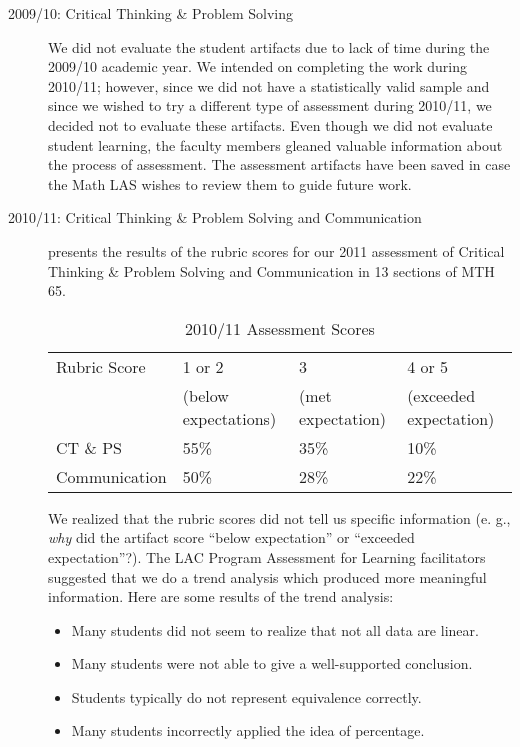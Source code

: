 \begin{description}
	\item[2009/10: Critical Thinking \& Problem Solving]
	      We did not evaluate the student artifacts due to lack of time during the 2009/10
	      academic year.
	      We intended on completing the work during 2010/11; however, since we did not have a statistically valid sample and since we wished to try a different type of assessment during 2010/11, we decided not to evaluate these artifacts.
	      Even though we did not evaluate student learning, the faculty members gleaned valuable information about the process of assessment.
	      The assessment artifacts have been saved in case the Math LAS wishes to review them to guide future work.
	\item[2010/11:  Critical Thinking \& Problem Solving and Communication]
	       presents the results of the rubric scores for our
	      2011 assessment of Critical Thinking \& Problem Solving and Communication in 13
	      sections of MTH 65.
	      \begin{table}[!htb]
		      \centering
		      \caption{2010/11 Assessment Scores}\label{ass:tab:201011scores}
		      \begin{tabularx}{\linewidth}{Xlll}
			      \toprule
			      Rubric Score  & 1 or 2               & 3                 & 4 or 5                 \\
			                    & (below expectations) & (met expectation) & (exceeded expectation) \\
			      \midrule
			      CT \& PS      & 55\%                 & 35\%              & 10\%                   \\
			      Communication & 50\%                 & 28\%              & 22\%                   \\
			      \bottomrule
		      \end{tabularx}
	      \end{table}

	      We realized that the rubric scores did not tell us specific information (e.
	      g.,
	      \emph{why} did the artifact score ``below expectation'' or ``exceeded
	      expectation''?).
	      The LAC Program Assessment for Learning  facilitators suggested that we do a trend analysis which produced more meaningful information.
	      Here are some results of the trend analysis: \begin{itemize} \item Many students did not seem to realize that not all data are linear.
		      \item Many students were not able to give a well-supported conclusion.
		      \item Students typically do not represent equivalence correctly.
		      \item Many students incorrectly applied the idea of percentage.
	      \end{itemize}


\end{description}
